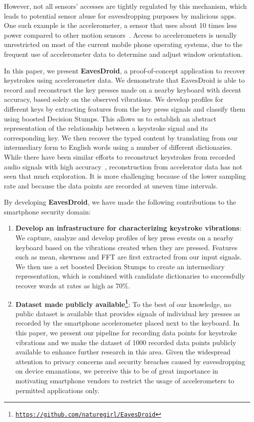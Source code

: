 \documentclass[11pt,conference]{IEEEtran}
\begin{document}
However, not all sensors' accesses are tightly regulated by this mechanism, which leads to potential sensor abuse for eavesdropping purposes by malicious apps.
One such example is the accelerometer, a sensor that uses about 10 times less power compared to other motion sensors~\cite{accelerometer-energy}.
Access to accelerometers is usually unrestricted on most of the current mobile phone operating systems, due to the frequent use of accelerometer data to determine and adjust window orientation.

In this paper, we present \textbf{EavesDroid}, a proof-of-concept application to recover keystrokes using 
accelerometer data. We demonstrate that EavesDroid is able to record and reconstruct the key presses made on a nearby keyboard with decent accuracy, based solely on the observed vibrations. We develop profiles for different keys by extracting features from the key press signals and classify them using boosted Decision Stumps. This allows us to establish an abstract representation of the relationship between a keystroke signal and its corresponding key. We then recover the typed content
by translating from our intermediary form to English words using a number
of different dictionaries.
While there have been similar efforts to reconstruct keystrokes from recorded audio signals with high accuracy~\cite{zhuang2005keyboard},
 reconstruction from accelerator data has not seen that much exploration. It is more challenging because of the lower sampling rate and because the data points are recorded at uneven time intervals.

By developing \textbf{EavesDroid}, we have made the following contributions to the smartphone security domain:
\begin{enumerate}
\item {\bf Develop an infrastructure for characterizing keystroke vibrations}: We
capture, analyze and develop profiles of key press events on a nearby
keyboard based on the vibrations created when they are pressed. Features such as mean, skewness and FFT are first extracted from our input signals. We then use a set boosted Decision Stumps to create an intermediary
representation, which is combined with candidate dictionaries
to successfully recover words at rates as high as 70\%.
\item {\bf Dataset made publicly available\footnote{\texttt{\url{https://github.com/naturegirl/EavesDroid}}}}: To the best of our knowledge,
no public dataset is available that provides signals of individual key presses as recorded by the smartphone accelerometer placed next to the keyboard. In this paper, we present our pipeline for recording data points for keystroke vibrations and we make the dataset of 1000 recorded data points publicly available to enhance further research in this area. Given
the widespread attention to privacy concerns and security breaches caused by eavesdropping on device emanations, we perceive this to be
of great importance in motivating smartphone vendors
to restrict the usage of accelerometers to permitted applications only.\\
\end{enumerate}
\end{document}
